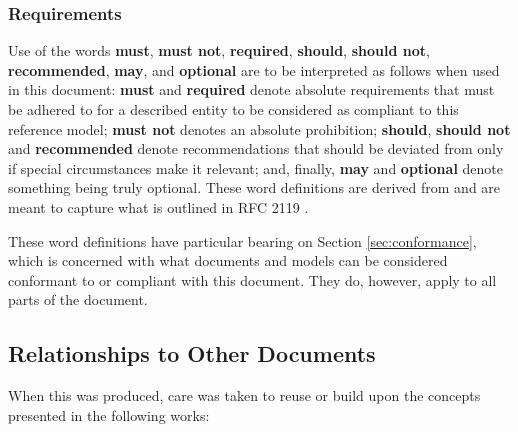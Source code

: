 \subsubsection{Requirements}

Use of the words \textbf{must}, \textbf{must not}, \textbf{required}, \textbf{should}, \textbf{should not}, \textbf{recommended}, \textbf{may}, and \textbf{optional} are to be interpreted as follows when used in this document: \textbf{must} and \textbf{required} denote absolute requirements that must be adhered to for a described entity to be considered as compliant to this reference model; \textbf{must not} denotes an absolute prohibition; \textbf{should}, \textbf{should not} and \textbf{recommended} denote recommendations that should be deviated from only if special circumstances make it relevant; and, finally, \textbf{may} and \textbf{optional} denote something being truly optional.
These word definitions are derived from and are meant to capture what is outlined in RFC 2119 \cite{bradner1997keywords}.

These word definitions have particular bearing on Section \ref{sec:conformance}, which is concerned with what documents and models can be considered conformant to or compliant with this document.
They do, however, apply to all parts of the document.

\subsection{Relationships to Other Documents}
\label{sec:introduction:relationships}

When this  was produced, care was taken to reuse or build upon the concepts presented in the following works:

